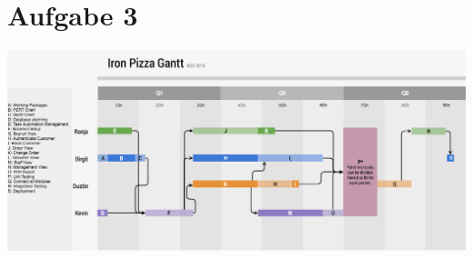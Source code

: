 \documentclass[a4paper]{report}
\begin{document}
\newpage
\section*{Aufgabe 3}
\includegraphics[width=14cm]{./ganttdiagramm.png}  
\end{document}
